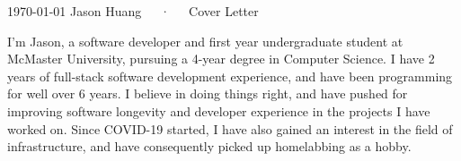 \documentclass[11pt, a4paper]{awesome-cv}
\begin{document}
\makecvheader[R]

\makecvfooter
  {\today}
  {Jason Huang~~~·~~~Cover Letter}
  {}

\makelettertitle

\begin{cvletter}

I'm Jason, a software developer and first year undergraduate student at McMaster University,
pursuing a 4-year degree in Computer Science.
I have 2 years of full-stack software development experience, 
and have been programming for well over 6 years.
I believe in doing things right,
and have pushed for improving software longevity 
and developer experience in the projects I have worked on.
Since COVID-19 started, I have also gained an interest in the field of infrastructure,
and have consequently picked up homelabbing as a hobby.


\end{cvletter}
\end{document}

